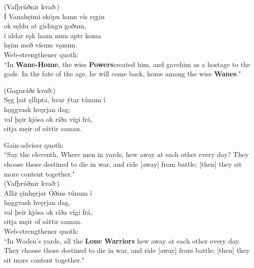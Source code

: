 (Vafþrúðnir kvað:) \\%
\bva Í Vanahęimi \hld skópu hann vís ręgin \\%
ok sęldu at gíslingu goðum, \\%
í aldar rǫk \hld hann mun aptr koma \\%
hęim með vísum vǫnum.\\%

\bvb Web-strengthener quoth: \\ “In \textbf{Wane-Home}, the wise \textbf{Powers}\footnotemark[69] created him, and gave\footnotemark[70] him as a hostage to the gods. In the fate of the age, he will come back, home among the wise \textbf{Wanes}." \\

(Gagnráðr kvað:) \\%
\bva Sęg þat ęllipta, \hld hvar ýtar túnum í \\%
hǫggvask hvęrjan dag; \\%
val þęir kjósa \hld ok ríða vígi frá, \\%
sitja męir of sáttir saman.\footnotemark[35]\\%

\bvb Gain-adviser quoth: \\ “Say the eleventh, Where men in yards, hew away at each other every day? They choose those destined to die in war, and ride [away] from battle; [then] they sit more content together." \\

(Vafþrúðnir kvað:) \\%
\bva Allir ęinhęrjar \hld Óðins túnum í \\%
hǫggvask hvęrjan dag, \\%
val þeir kjósa \hld ok ríða vígi frá, \\%
sitja męir of sáttir saman.\\%

\bvb Web-strengthener quoth: \\ “In Woden's yards, all the \textbf{Lone Warriors} hew away at each other every day. They choose those destined to die in war, and ride [away] from battle; [then] they sit more content together." \\


